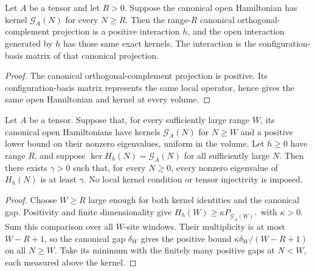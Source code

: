 \begin{lemma}
    \label{lem:positive_canonical_interaction_exact_open_kernels}
    \leanok
    Let $A$ be a tensor and let $R>0$. Suppose the canonical open
    Hamiltonian has kernel $\mathcal G_A(N)$ for every $N\ge R$.
    Then the range-$R$ canonical orthogonal-complement projection is a
    positive interaction $h$, and the open interaction generated by $h$
    has those same exact kernels. The interaction is the
    configuration-basis matrix of that canonical projection.
\end{lemma}
\begin{proof}\leanok
    The canonical orthogonal-complement projection is positive. Its
    configuration-basis matrix represents the same local operator,
    hence gives the same open Hamiltonian and kernel at every volume.
\end{proof}

\begin{lemma}
    \label{thm:canonical_gap_to_eventual_kernel_interaction}
    \leanok
    Let $A$ be a tensor. Suppose that, for every sufficiently large range $W$,
    its canonical open Hamiltonians have kernels $\mathcal G_A(N)$ for $N\ge W$
    and a positive lower bound on their nonzero eigenvalues, uniform in the
    volume. Let $h\ge0$ have range $R$, and suppose
    $\ker H_h(N)=\mathcal G_A(N)$ for all sufficiently large $N$.
    Then there exists $\gamma>0$ such that, for every $N\ge0$, every
    nonzero eigenvalue of $H_h(N)$ is at least $\gamma$.
    No local kernel condition or tensor injectivity is imposed.
\end{lemma}
\begin{proof}\leanok
    Choose $W\ge R$ large enough for both kernel identities and the canonical
    gap. Positivity and finite dimensionality give
    $H_h(W)\ge\kappa P_{\mathcal G_A(W)^\perp}$ with $\kappa>0$.
    Sum this comparison over all $W$-site windows. Their multiplicity is at most
    $W-R+1$, so the canonical gap $\delta_W$ gives the positive bound
    $\kappa\delta_W/(W-R+1)$ on all $N\ge W$.
    Take its minimum with the finitely many positive gaps at $N<W$, each
    measured above the kernel.
\end{proof}

